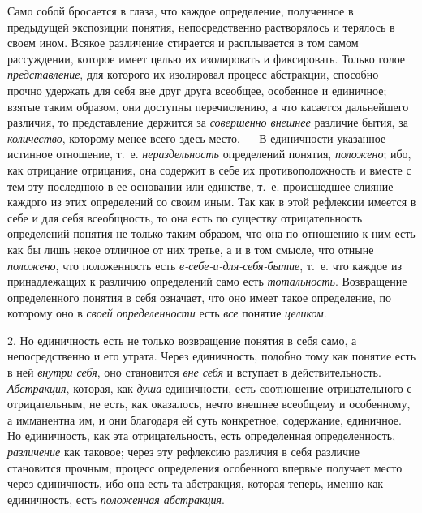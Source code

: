 \documentclass[twoside]{article}
\begin{document}
{{Само собой бросается в глаза, что каждое определение,
полученное в предыдущей экспозиции понятия, непосредственно растворялось и
терялось в своем ином. Всякое различение стирается и расплывается в том
самом рассуждении, которое имеет целью их изолировать и фиксировать. Только
голое {\em представление},
для которого их изолировал процесс абстракции, способно
прочно удержать для себя вне друг друга всеобщее, особенное и единичное;
взятые таким образом, они доступны перечислению, а что касается дальнейшего
различия, то представление держится за
{\em совершенно внешнее}
различие бытия, за
{\em количество},
которому менее всего здесь место. — В
единичности указанное истинное отношение, т.~е.
{\em нераздельность}
определений понятия,
{\em положено}; ибо, как
отрицание отрицания, она содержит в себе их противоположность и вместе с
тем эту последнюю в ее основании или единстве, т.~е. происшедшее слияние
каждого из этих определений со своим иным. Так как в этой рефлексии
имеется в себе и для себя всеобщность, то она есть по существу
отрицательность определений понятия не только таким образом, что она по
отношению к ним есть как бы лишь некое отличное от них третье, а и в том
смысле, что отныне {\em положено},
что положенность есть
{\em в-себе-и-для-себя-бытие},
т.~е. что каждое из принадлежащих к различию определений само
есть {\em тотальность}.
Возвращение определенного понятия в себя означает, что оно
имеет такое определение, по которому оно в
{\em своей определенности}
есть {\em все} понятие {\em целиком}.

2. Но единичность есть не только возвращение понятия в себя
само, а непосредственно и его утрата. Через единичность, подобно тому как
понятие есть в ней
{\em внутри себя}, оно
становится {\em вне себя}
и вступает в действительность.
{\em Абстракция},
которая, как {\em душа}
единичности, есть соотношение отрицательного с отрицательным,
не есть, как оказалось, нечто внешнее всеобщему и особенному, а имманентна
им, и они благодаря ей суть конкретное, содержание, единичное. Но
единичность, как эта отрицательность, есть определенная определенность,
{\em различение} как
таковое; через эту рефлексию различия в себя различие становится прочным;
процесс определения особенного впервые получает место через единичность,
ибо она есть та абстракция, которая теперь, именно как единичность, есть
{\em положенная абстракция}.

}}
\end{document}
